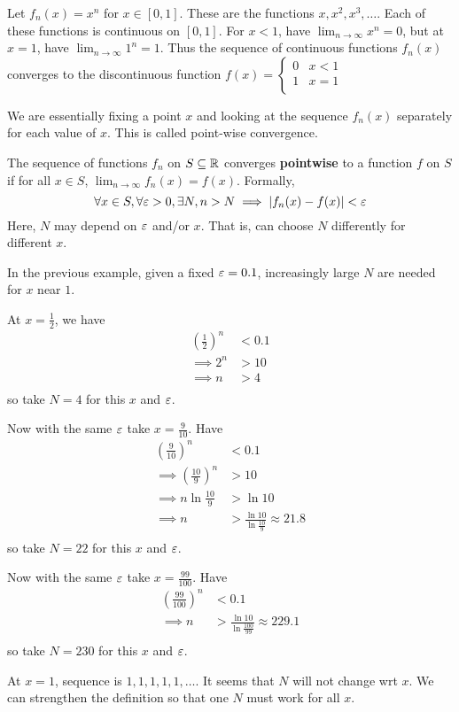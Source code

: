 \documentclass{article}
\begin{document}
\begin{example}
  Let $f_n(x) = x^n$ for $x \in [0, 1]$. These are the functions $x, x^2, x^3, \ldots$. Each of these functions is continuous on $[0, 1]$. For $x < 1$, have $\lim_{n\to\infty} x^n = 0$, but at $x=1$, have $\lim_{n\to\infty} 1^n = 1$. Thus the sequence of continuous functions $f_n(x)$ converges to the discontinuous function $f(x) =
  \begin{cases}
    0 & x < 1\\
    1 & x = 1\\
  \end{cases}$

  We are essentially fixing a point $x$ and looking at the sequence $f_n(x)$ separately for each value of $x$. This is called point-wise convergence.
\end{example}
\begin{definition}
  The sequence of functions $f_n$ on $S \subseteq \mathbb{R}$ converges \textbf{pointwise} to a function $f$ on $S$ if for all $x \in S$, $\lim_{n\to\infty} f_n(x) = f(x)$. Formally,
  \[
    \forall x \in S, \forall \varepsilon > 0, \exists N, n > N \implies \abs{f_n(x) - f(x)} < \varepsilon
  \]
  Here, $N$ may depend on $\varepsilon$ and/or $x$. That is, can choose $N$ differently for different $x$.
\end{definition}
\begin{example}
  In the previous example, given a fixed $\varepsilon = 0.1$, increasingly large $N$ are needed for $x$ near $1$.

  At $x = \frac{1}{2}$, we have
  \begin{align*}
    \left(\frac{1}{2}\right)^n &< 0.1\\
    \implies 2^n &> 10\\
    \implies n &> 4\\
  \end{align*}
  so take $N = 4$ for this $x$ and $\varepsilon$.

  Now with the same $\varepsilon$ take $x = \frac{9}{10}$. Have
  \begin{align*}
    \left(\frac{9}{10}\right)^n &< 0.1\\
    \implies \left(\frac{10}{9}\right)^n &> 10\\
    \implies n \ln \frac{10}{9} &> \ln 10\\
    \implies n &> \frac{\ln 10}{\ln \frac{10}{9}} \approx 21.8\\
  \end{align*}
  so take $N = 22$ for this $x$ and $\varepsilon$.

  Now with the same $\varepsilon$ take $x = \frac{99}{100}$. Have
  \begin{align*}
    \left(\frac{99}{100}\right)^n &< 0.1\\
    \implies n &> \frac{\ln 10}{\ln \frac{100}{99}} \approx 229.1\\
  \end{align*}
  so take $N = 230$ for this $x$ and $\varepsilon$.

  At $x=1$, sequence is $1, 1, 1, 1, 1, \ldots$. It seems that $N$ will not change wrt $x$. We can strengthen the definition so that one $N$ must work for all $x$.
\end{example}
\end{document}
